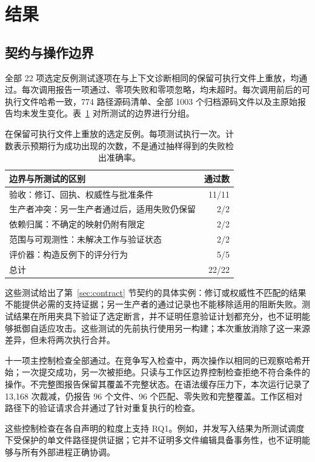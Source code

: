 \section{结果}
\label{sec:results}
\subsection{契约与操作边界}
全部 22 项选定反例测试逐项在与上下文诊断相同的保留可执行文件上重放，均通过。每次调用报告一项通过、零项失败和零项忽略，均未超时。每次调用前后的可执行文件哈希一致，774 路径源码清单、全部 1003 个归档源码文件以及主原始报告均未发生变化。表~\ref{tab:counterexamples} 对所测试的边界进行分组。

\begin{table}[t]
\small
\caption{在保留可执行文件上重放的选定反例。每项测试执行一次。计数表示预期行为成功出现的次数，不是通过抽样得到的失败检出准确率。}
\label{tab:counterexamples}
\begin{tabularx}{\columnwidth}{@{}Xr@{}}
\toprule
边界与所测试的区别 & 通过数\\
\midrule
验收：修订、回执、权威性与批准条件 & 11/11\\
生产者冲突：另一生产者通过后，适用失败仍保留 & 2/2\\
依赖归属：不确定的映射仍附有限定 & 2/2\\
范围与可观测性：未解决工作与验证状态 & 2/2\\
评价器：构造反例下的评分行为 & 5/5\\
\midrule
总计 & 22/22\\
\bottomrule
\end{tabularx}
\end{table}

这些测试给出了第~\ref{sec:contract} 节契约的具体实例：修订或权威性不匹配的结果不能提供必需的支持证据；另一生产者的通过记录也不能移除适用的阻断失败。测试结果在所用夹具下验证了选定断言，并不证明任意验证计划都充分，也不证明能够抵御自适应攻击。这些测试的先前执行使用另一构建；本次重放消除了这一来源差异，但未将两次执行合并。

十一项主控制检查全部通过。在竞争写入检查中，两次操作以相同的已观察哈希开始；一次提交成功，另一次被拒绝。只读与工作区边界控制检查拒绝不符合条件的操作。不完整图报告保留其覆盖不完整状态。在语法缓存压力下，本次运行记录了 13,168 次裁减，仍报告 96 个文件、96 个匹配、零失败和完整覆盖。工作区相对路径下的验证请求合并通过了针对重复执行的检查。

这些控制检查在各自声明的粒度上支持 RQ1。例如，并发写入结果为所测试调度下受保护的单文件路径提供证据；它并不证明多文件编辑具备事务性，也不证明能够与所有外部进程正确协调。

